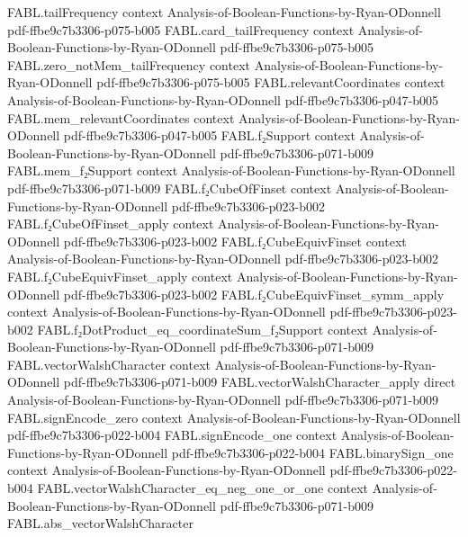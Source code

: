 \begin{theorem}
  {FABL.tailFrequency}
  {context}
  {Analysis-of-Boolean-Functions-by-Ryan-ODonnell}
  {pdf-ffbe9c7b3306-p075-b005}
\proofstep
  {FABL.card_tailFrequency}
  {context}
  {Analysis-of-Boolean-Functions-by-Ryan-ODonnell}
  {pdf-ffbe9c7b3306-p075-b005}
\proofstep
  {FABL.zero_notMem_tailFrequency}
  {context}
  {Analysis-of-Boolean-Functions-by-Ryan-ODonnell}
  {pdf-ffbe9c7b3306-p075-b005}
\proofstep
  {FABL.relevantCoordinates}
  {context}
  {Analysis-of-Boolean-Functions-by-Ryan-ODonnell}
  {pdf-ffbe9c7b3306-p047-b005}
\proofstep
  {FABL.mem_relevantCoordinates}
  {context}
  {Analysis-of-Boolean-Functions-by-Ryan-ODonnell}
  {pdf-ffbe9c7b3306-p047-b005}
\proofstep
  {FABL.f₂Support}
  {context}
  {Analysis-of-Boolean-Functions-by-Ryan-ODonnell}
  {pdf-ffbe9c7b3306-p071-b009}
\proofstep
  {FABL.mem_f₂Support}
  {context}
  {Analysis-of-Boolean-Functions-by-Ryan-ODonnell}
  {pdf-ffbe9c7b3306-p071-b009}
\proofstep
  {FABL.f₂CubeOfFinset}
  {context}
  {Analysis-of-Boolean-Functions-by-Ryan-ODonnell}
  {pdf-ffbe9c7b3306-p023-b002}
\proofstep
  {FABL.f₂CubeOfFinset_apply}
  {context}
  {Analysis-of-Boolean-Functions-by-Ryan-ODonnell}
  {pdf-ffbe9c7b3306-p023-b002}
\proofstep
  {FABL.f₂CubeEquivFinset}
  {context}
  {Analysis-of-Boolean-Functions-by-Ryan-ODonnell}
  {pdf-ffbe9c7b3306-p023-b002}
\proofstep
  {FABL.f₂CubeEquivFinset_apply}
  {context}
  {Analysis-of-Boolean-Functions-by-Ryan-ODonnell}
  {pdf-ffbe9c7b3306-p023-b002}
\proofstep
  {FABL.f₂CubeEquivFinset_symm_apply}
  {context}
  {Analysis-of-Boolean-Functions-by-Ryan-ODonnell}
  {pdf-ffbe9c7b3306-p023-b002}
\proofstep
  {FABL.f₂DotProduct_eq_coordinateSum_f₂Support}
  {context}
  {Analysis-of-Boolean-Functions-by-Ryan-ODonnell}
  {pdf-ffbe9c7b3306-p071-b009}
\proofstep
  {FABL.vectorWalshCharacter}
  {context}
  {Analysis-of-Boolean-Functions-by-Ryan-ODonnell}
  {pdf-ffbe9c7b3306-p071-b009}
\proofstep
  {FABL.vectorWalshCharacter_apply}
  {direct}
  {Analysis-of-Boolean-Functions-by-Ryan-ODonnell}
  {pdf-ffbe9c7b3306-p071-b009}
\proofstep
  {FABL.signEncode_zero}
  {context}
  {Analysis-of-Boolean-Functions-by-Ryan-ODonnell}
  {pdf-ffbe9c7b3306-p022-b004}
\proofstep
  {FABL.signEncode_one}
  {context}
  {Analysis-of-Boolean-Functions-by-Ryan-ODonnell}
  {pdf-ffbe9c7b3306-p022-b004}
\proofstep
  {FABL.binarySign_one}
  {context}
  {Analysis-of-Boolean-Functions-by-Ryan-ODonnell}
  {pdf-ffbe9c7b3306-p022-b004}
\proofstep
  {FABL.vectorWalshCharacter_eq_neg_one_or_one}
  {context}
  {Analysis-of-Boolean-Functions-by-Ryan-ODonnell}
  {pdf-ffbe9c7b3306-p071-b009}
\proofstep
  {FABL.abs_vectorWalshCharacter}

\end{theorem}
